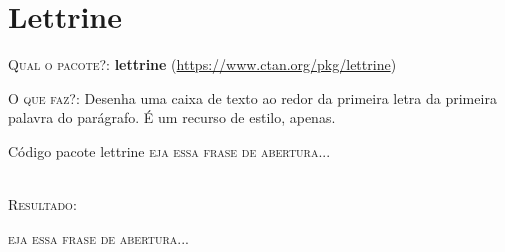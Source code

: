 \chapter{Lettrine}

\textsc{Qual o pacote?}: \textbf{lettrine} (\url{https://www.ctan.org/pkg/lettrine})

\textsc{O que faz?}: Desenha uma caixa de texto ao redor da primeira letra da primeira palavra do parágrafo. É um recurso de estilo, apenas.
\ \\

\begin{codex}{Código pacote lettrine}
\lettrine[findent=2pt]{}{eja essa frase de abertura...} \lipsum[1]
\end{codex}
\ \\

\textsc{Resultado}:

\lettrine[findent=2pt]{}{eja essa frase de abertura...} \lipsum[1]